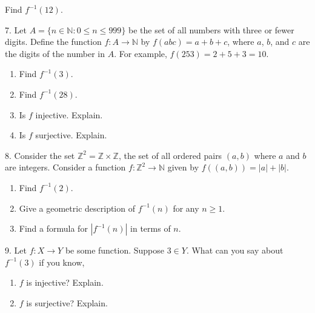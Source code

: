 \documentclass[10pt,]{book}
\theoremstyle{plain}
\theoremstyle{definition}
\theoremstyle{definition}
\theoremstyle{definition}
\numberwithin{equation}{chapter}
\def\N{\mathbb N}
\def\Z{\mathbb Z}
\def\inv{^{-1}}
\def\st{:}
\begin{document}
\begin{exerciselist}
\begin{enumerate}[label=(\alph*)]
Find \(f\inv(12)\).%
\end{enumerate}
%
\par\smallskip
\item[7.]\hypertarget{exercise-88}{}\hypertarget{p-2207}{}%
Let \(A = \{n \in \N \st 0 \le n \le 999\}\) be the set of all numbers with three or fewer digits. Define the function \(f:A \to \N\) by \(f(abc) = a+b+c\), where \(a\), \(b\), and \(c\) are the digits of the number in \(A\). For example, \(f(253) = 2 + 5 + 3 =  10\). \leavevmode%
\begin{enumerate}[label=(\alph*)]
\item\hypertarget{li-426}{}\hypertarget{p-2208}{}%
Find \(f\inv(3)\).%
\item\hypertarget{li-427}{}\hypertarget{p-2209}{}%
Find \(f\inv(28)\).%
\item\hypertarget{li-428}{}\hypertarget{p-2210}{}%
Is \(f\) injective. Explain.%
\item\hypertarget{li-429}{}\hypertarget{p-2211}{}%
Is \(f\) surjective. Explain.%
\end{enumerate}
%
\par\smallskip
\item[8.]\hypertarget{exercise-89}{}\hypertarget{p-2215}{}%
Consider the set \(\Z^2 = \Z \times \Z\), the set of all ordered pairs \((a,b)\) where \(a\) and \(b\) are integers.  Consider a function \(f: \Z^2 \to \N\) given by \(f((a,b)) = |a| + |b|\). \leavevmode%
\begin{enumerate}[label=(\alph*)]
\item\hypertarget{li-434}{}\hypertarget{p-2216}{}%
Find \(f\inv(2)\).%
\item\hypertarget{li-435}{}\hypertarget{p-2217}{}%
Give a geometric description of \(f\inv(n)\) for any \(n \ge 1\).%
\item\hypertarget{li-436}{}\hypertarget{p-2218}{}%
Find a formula for \(|f\inv(n)|\) in terms of \(n\).%
\end{enumerate}
%
\par\smallskip
\item[9.]\hypertarget{exercise-90}{}\hypertarget{p-2223}{}%
Let \(f:X \to Y\) be some function. Suppose \(3 \in Y\). What can you say about \(f\inv(3)\) if you know, \leavevmode%
\begin{enumerate}[label=(\alph*)]
\item\hypertarget{li-440}{}\hypertarget{p-2224}{}%
\(f\) is injective? Explain.%
\item\hypertarget{li-441}{}\hypertarget{p-2225}{}%
\(f\) is surjective? Explain.%

\end{enumerate}
\end{exerciselist}
\end{document}
